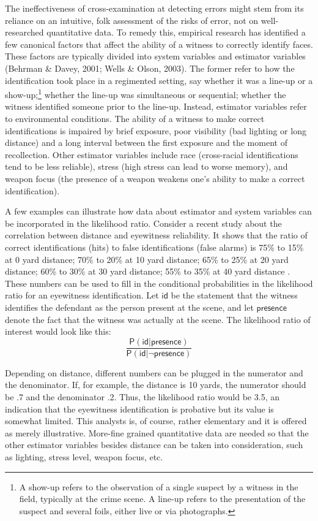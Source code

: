 \documentclass[
  10pt,
  dvipsnames,enabledeprecatedfontcommands]{scrartcl}
\newcommand{\pr}[1]{\mathsf{P}(#1)}
\begin{document}
The ineffectiveness of cross-examination at detecting errors might stem
from its reliance on an intuitive, folk assessment of the risks of
error, not on well-researched quantitative data. To remedy this,
empirical research has identified a few canonical factors that affect
the ability of a witness to correctly identify faces. These factors are
typically divided into system variables and estimator variables (Behrman
\& Davey, 2001; Wells \& Olson, 2003). The former refer to how the
identification took place in a regimented setting, say whether it was a
line-up or a
show-up;\footnote{A show-up refers to the observation of a single suspect by a witness in the field, typically at the crime scene. A line-up refers to the presentation of the suspect and several foils, either live or via photographs.}
whether the line-up was simultaneous or sequential; whether the witness
identified someone prior to the line-up. Instead, estimator variables
refer to environmental conditions. The ability of a witness to make
correct identifications is impaired by brief exposure, poor visibility
(bad lighting or long distance) and a long interval between the first
exposure and the moment of recollection. Other estimator variables
include race (cross-racial identifications tend to be less reliable),
stress (high stress can lead to worse memory), and weapon focus (the
presence of a weapon weakens one's ability to make a correct
identification).

A few examples can illustrate how data about estimator and system
variables can be incorporated in the likelihood ratio. Consider a recent
study about the correlation between distance and eyewitness reliability.
It shows that the ratio of correct identifications (hits) to false
identifications (false alarms) is 75\% to 15\% at 0 yard distance; 70\%
to 20\% at 10 yard distance; 65\% to 25\% at 20 yard distance; 60\% to
30\% at 30 yard distance; 55\% to 35\% at 40 yard distance
\citep{lampinen2014}.  These numbers can be used to
fill in the conditional probabilities in the likelihood ratio for an
eyewitness identification. Let \(\textsf{id}\) be the statement that the
witness identifies the defendant as the person present at the scene, and
let \(\textsf{presence}\) denote the fact that the witness was actually
at the scene. The likelihood ratio of interest would look like this:
\[\frac{\pr{\textsf{id} \vert \textsf{presence}}}{\pr{\textsf{id} \vert \neg \textsf{presence}}}\]

\noindent Depending on distance, different numbers can be plugged in the
numerator and the denominator. If, for example, the distance is 10
yards, the numerator should be .7 and the denominator .2. Thus, the
likelihood ratio would be 3.5, an indication that the eyewitness
identification is probative but its value is somewhat limited. This
analysts is, of course, rather elementary and it is offered as merely
illustrative. More-fine grained quantitative data are needed so that the
other estimator variables besides distance can be taken into
consideration, such as lighting, stress level, weapon focus, etc.
\end{document}
